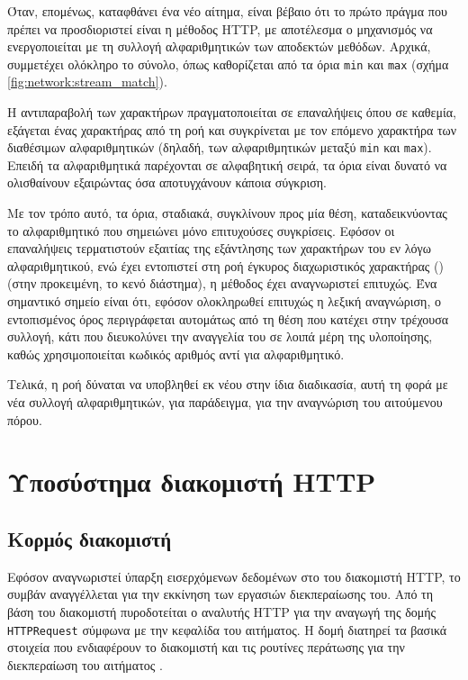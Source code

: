 Όταν, επομένως, καταφθάνει ένα νέο αίτημα, είναι βέβαιο ότι το πρώτο πράγμα που
πρέπει να προσδιοριστεί είναι η μέθοδος HTTP, με αποτέλεσμα ο μηχανισμός να
ενεργοποιείται με τη συλλογή αλφαριθμητικών των αποδεκτών μεθόδων. Αρχικά,
συμμετέχει ολόκληρο το σύνολο, όπως καθορίζεται από τα όρια \verb~min~ και
\verb~max~ (σχήμα \ref{fig:network:stream_match}).

Η αντιπαραβολή των χαρακτήρων πραγματοποιείται σε επαναλήψεις όπου σε καθεμία,
εξάγεται ένας χαρακτήρας από τη ροή και συγκρίνεται με τον επόμενο χαρακτήρα
των διαθέσιμων αλφαριθμητικών (δηλαδή, των αλφαριθμητικών μεταξύ \verb~min~ και
\verb~max~). Επειδή τα αλφαριθμητικά παρέχονται σε αλφαβητική σειρά, τα όρια
είναι δυνατό να ολισθαίνουν εξαιρώντας όσα αποτυγχάνουν κάποια σύγκριση.

Με τον τρόπο αυτό, τα όρια, σταδιακά, συγκλίνουν προς μία θέση, καταδεικνύοντας
το αλφαριθμητικό που σημειώνει μόνο επιτυχούσες συγκρίσεις. Εφόσον οι
επαναλήψεις τερματιστούν εξαιτίας της εξάντλησης των χαρακτήρων του εν λόγω
αλφαριθμητικού, ενώ έχει εντοπιστεί στη ροή έγκυρος διαχωριστικός χαρακτήρας
() (στην προκειμένη, το κενό διάστημα), η μέθοδος έχει
αναγνωριστεί επιτυχώς. Ένα σημαντικό σημείο είναι ότι, εφόσον ολοκληρωθεί
επιτυχώς η λεξική αναγνώριση, ο εντοπισμένος όρος περιγράφεται αυτομάτως από τη
θέση που κατέχει στην τρέχουσα συλλογή, κάτι που διευκολύνει την αναγγελία του
σε λοιπά μέρη της υλοποίησης, καθώς χρησιμοποιείται κωδικός αριθμός αντί για
αλφαριθμητικό.

Τελικά, η ροή δύναται να υποβληθεί εκ νέου στην ίδια διαδικασία, αυτή τη φορά με
νέα συλλογή αλφαριθμητικών, για παράδειγμα, για την αναγνώριση του αιτούμενου
πόρου.



\section{Υποσύστημα διακομιστή HTTP}
\label{sec:http-server}



\subsection{Κορμός διακομιστή}
\label{subsec:network:server-base}

Εφόσον αναγνωριστεί ύπαρξη εισερχόμενων δεδομένων στο  του διακομιστή
HTTP, το συμβάν αναγγέλλεται για την εκκίνηση των εργασιών διεκπεραίωσης του.
Από τη βάση του διακομιστή πυροδοτείται ο αναλυτής HTTP για την αναγωγή της
δομής \verb~HTTPRequest~ σύμφωνα με την κεφαλίδα του αιτήματος.
Η δομή διατηρεί τα βασικά στοιχεία που ενδιαφέρουν το διακομιστή και τις
ρουτίνες περάτωσης για την διεκπεραίωση του αιτήματος
.

